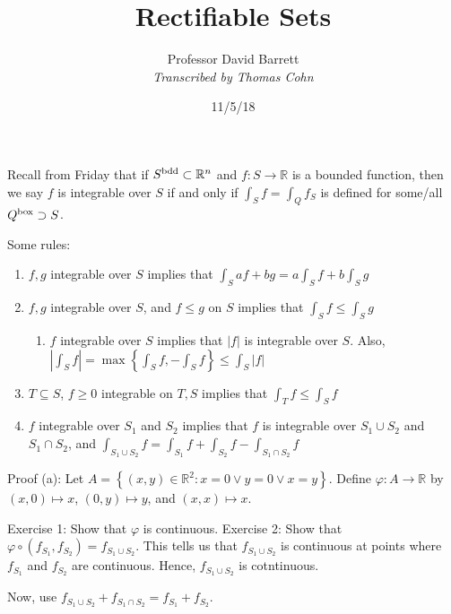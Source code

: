 \documentclass[10pt,letterpaper]{article}
\author{Professor David Barrett\\ \small\textit{Transcribed by Thomas Cohn}}
\title{Rectifiable Sets}
\date{11/5/18} %
\newcommand{\n}{\hfill\break}
\newcommand{\ptxt}[1]{\textrm{\textnormal{#1}}}
\newcommand{\set}[1]{\left\{#1\right\}}
\newcommand{\reals}{\mathbb{R}}
\newcommand{\R}{\reals}
\newcommand{\abs}[1]{\left|#1\right|}
\newcommand{\of}{\circ}
\begin{document}
\maketitle
\setlength\RaggedRightParindent{\parindent}
\RaggedRight

\par\noindent Recall from Friday that if $S^{\ptxt{bdd}}\subset\R^{n}$ and $f:S\to\R$ is a bounded function, then we say $f$ is integrable over $S$ if and only if $\int_{S}f=\int_{Q}f_{S}$ is defined for some/all $Q^{\ptxt{box}}\supset{}S$.\n

\par\noindent Some rules:
\begin{enumerate}[label=(\alph*)]
	\item $f,g$ integrable over $S$ implies that $\displaystyle\int_{S}af+bg=a\int_{S}f+b\int_{S}g$
	\item $f,g$ integrable over $S$, and $f\le{}g$ on $S$ implies that $\displaystyle\int_{S}f\le\int_{S}g$
	\begin{enumerate}[label=(\alph*$'$),start=2]
		\item $f$ integrable over $S$ implies that $\abs{f}$ is integrable over $S$.\n
		Also, $\displaystyle\abs{\int_{S}f}=\max\set{\int_{S}f,-\int_{S}f}\le\int_{S}\abs{f}$
	\end{enumerate}
	\item $T\subseteq{}S$, $f\ge{}0$ integrable on $T,S$ implies that $\displaystyle\int_{T}f\le\int_{S}f$
	\item $f$ integrable over $S_{1}$ and $S_{2}$ implies that $f$ is integrable over $S_{1}\cup{}S_{2}$ and $S_{1}\cap{}S_{2}$, and\n
	$\displaystyle\int_{S_{1}\cup{}S_{2}}f=\int_{S_{1}}f+\int_{S_{2}}f-\int_{S_{1}\cap{}S_{2}}f$
\end{enumerate}

\par\noindent Proof (a): Let $A=\set{(x,y)\in\R^{2}:x=0\lor{}y=0\lor{}x=y}$. Define $\varphi:A\to\R$ by $(x,0)\mapsto{}x$, $(0,y)\mapsto{}y$, and $(x,x)\mapsto{}x$.\n

\par\noindent Exercise 1: Show that $\varphi$ is continuous.\n
Exercise 2: Show that $\varphi\of(f_{S_{1}},f_{S_{2}})=f_{S_{1}\cup{}S_{2}}$. This tells us that $f_{S_{1}\cup{}S_{2}}$ is continuous at points where $f_{S_{1}}$ and $f_{S_{2}}$ are continuous. Hence, $f_{S_{1}\cup{}S_{2}}$ is cotntinuous.\n

\par\noindent Now, use $f_{S_{1}\cup{}S_{2}}+f_{S_{1}\cap{}S_{2}}=f_{S_{1}}+f_{S_{2}}$.\n
\end{document}
